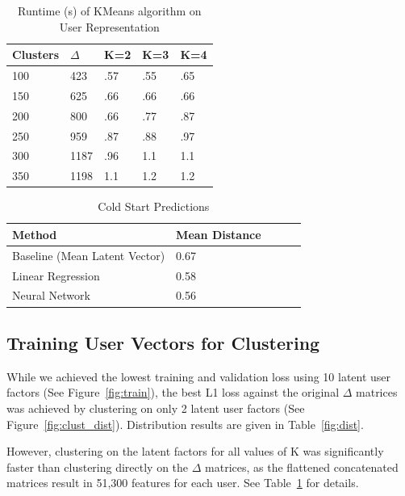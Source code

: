 \documentclass{article}
\begin{document}
\begin{table}[t]
\centering
\caption{Runtime (s) of KMeans algorithm on User Representation}
\label{fig:time}
\begin{tabular}{lllll}
                         \multicolumn{1}{l|}{Clusters}& $\Delta$ & K=2 & K=3 & K=4 \\ \hline
\multicolumn{1}{l|}{100} & 423      & .57 & .55 & .65 \\
\multicolumn{1}{l|}{150} & 625      & .66 & .66 & .66 \\
\multicolumn{1}{l|}{200} & 800      & .66 & .77 & .87 \\
\multicolumn{1}{l|}{250} & 959      & .87 & .88 & .97 \\
\multicolumn{1}{l|}{300} & 1187     & .96 & 1.1 & 1.1 \\
\multicolumn{1}{l|}{350} & 1198     & 1.1 & 1.2 & 1.2
\end{tabular}
\end{table}

\begin{table}[t]
\centering
\caption{Cold Start Predictions}
\label{tbl:cold_start_technique_1}
\begin{tabular}{lllll}
                         \multicolumn{1}{l|}{Method}& Mean Distance \\ \hline
\multicolumn{1}{l|}{Baseline (Mean Latent Vector)} & 0.67 \\
\multicolumn{1}{l|}{Linear Regression} & 0.58 \\
\multicolumn{1}{l|}{Neural Network} & 0.56 \\

\end{tabular}
\end{table}
\subsection{Training User Vectors for Clustering}
While we achieved the lowest training and validation loss using 10 latent user factors (See Figure~\ref{fig:train}), the best L1 loss against the original $\Delta$ matrices was achieved by clustering on only 2 latent user factors (See Figure~\ref{fig:clust_dist}).  Distribution results are given in Table~\ref{fig:dist}.

However, clustering on the latent factors for all values of K was significantly faster than clustering directly on the $\Delta$ matrices, as the flattened concatenated matrices result in 51,300 features for each user. See Table~\ref{fig:time} for details.
\end{document}
